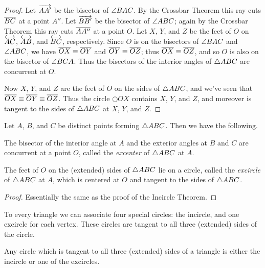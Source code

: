 \begin{proof}
Let \(\overrightarrow{AA'}\) be the bisector of \(\angle{BAC}\).
By the Crossbar Theorem this ray cuts \(\overline{BC}\) at a point \(A''\).
Let \(\overrightarrow{BB'}\) be the bisector of \(\angle{ABC}\); again by the Crossbar Theorem this ray cuts \(\overline{AA''}\) at a point \(O\).
Let \(X\), \(Y\), and \(Z\) be the feet of \(O\) on \(\overleftrightarrow{AC}\), \(\overleftrightarrow{AB}\), and \(\overleftrightarrow{BC}\), respectively.
Since \(O\) is on the bisectors of \(\angle{BAC}\) and \(\angle{ABC}\), we have \(\overline{OX} \equiv \overline{OY}\) and \(\overline{OY} \equiv \overline{OZ}\); thus \(\overline{OX} \equiv \overline{OZ}\), and so \(O\) is also on the bisector of \(\angle{BCA}\).
Thus the bisectors of the interior angles of \(\bigtriangleup{ABC}\) are concurrent at \(O\).

Now \(X\), \(Y\), and \(Z\) are the feet of \(O\) on the sides of \(\bigtriangleup{ABC}\), and we've seen that \(\overline{OX} \equiv \overline{OY} \equiv \overline{OZ}\).
Thus the circle \(\Circle{O}{X}\) contains \(X\), \(Y\), and \(Z\), and moreover is tangent to the sides of \(\bigtriangleup{ABC}\) at \(X\), \(Y\), and \(Z\).
\end{proof}

\begin{construct}
Let \(A\), \(B\), and \(C\) be distinct points forming \(\bigtriangleup{ABC}\).
Then we have the following.
\begin{proplist}
\item The bisector of the interior angle at \(A\) and the exterior angles at \(B\) and \(C\) are concurrent at a point \(O\), called the \emph{excenter} of \(\bigtriangleup{ABC}\) at \(A\).

\item The feet of \(O\) on the (extended) sides of \(\bigtriangleup{ABC}\) lie on a circle, called the \emph{excircle} of \(\bigtriangleup{ABC}\) at \(A\), which is centered at \(O\) and tangent to the sides of \(\bigtriangleup{ABC}\).
\end{proplist}
\end{construct}

\begin{proof}
Essentially the same as the proof of the Incircle Theorem.
\end{proof}

To every triangle we can associate four special circles: the incircle, and one excircle for each vertex.
These circles are tangent to all three (extended) sides of the circle.

\begin{prop}
Any circle which is tangent to all three (extended) sides of a triangle is either the incircle or one of the excircles.
\end{prop}
